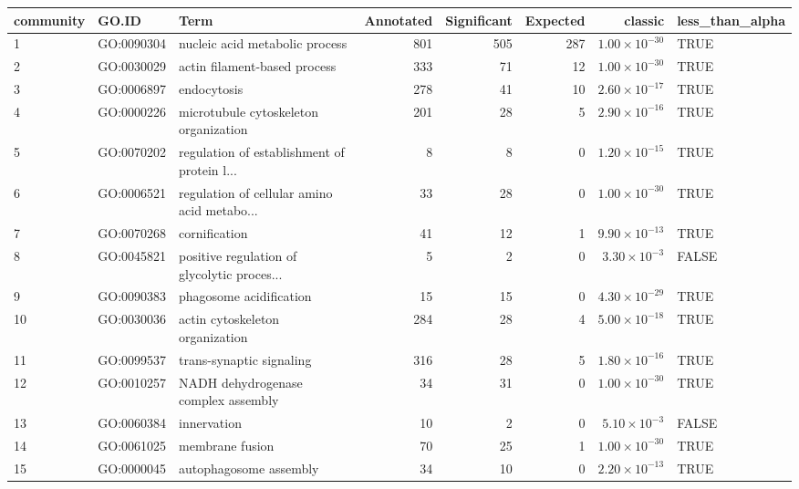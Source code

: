 \begin{table}[ht]
\centering
\begin{adjustbox}{max width=\textwidth}
\begin{tabular}{lllrrrrl}
  \hline
community & GO.ID & Term & Annotated & Significant & Expected & classic & less\_than\_alpha \\ 
  \hline
1 & GO:0090304 & nucleic acid metabolic process & 801 & 505 & 287 & $1.00 \times 10^{-30}$ & TRUE \\ 
  2 & GO:0030029 & actin filament-based process & 333 & 71 & 12 & $1.00 \times 10^{-30}$ & TRUE \\ 
  3 & GO:0006897 & endocytosis & 278 & 41 & 10 & $2.60 \times 10^{-17}$ & TRUE \\ 
  4 & GO:0000226 & microtubule cytoskeleton organization & 201 & 28 & 5 & $2.90 \times 10^{-16}$ & TRUE \\ 
  5 & GO:0070202 & regulation of establishment of protein l... & 8 & 8 & 0 & $1.20 \times 10^{-15}$ & TRUE \\ 
  6 & GO:0006521 & regulation of cellular amino acid metabo... & 33 & 28 & 0 & $1.00 \times 10^{-30}$ & TRUE \\ 
  7 & GO:0070268 & cornification & 41 & 12 & 1 & $9.90 \times 10^{-13}$ & TRUE \\ 
  8 & GO:0045821 & positive regulation of glycolytic proces... & 5 & 2 & 0 & $3.30 \times 10^{-3}$ & FALSE \\ 
  9 & GO:0090383 & phagosome acidification & 15 & 15 & 0 & $4.30 \times 10^{-29}$ & TRUE \\ 
  10 & GO:0030036 & actin cytoskeleton organization & 284 & 28 & 4 & $5.00 \times 10^{-18}$ & TRUE \\ 
  11 & GO:0099537 & trans-synaptic signaling & 316 & 28 & 5 & $1.80 \times 10^{-16}$ & TRUE \\ 
  12 & GO:0010257 & NADH dehydrogenase complex assembly & 34 & 31 & 0 & $1.00 \times 10^{-30}$ & TRUE \\ 
  13 & GO:0060384 & innervation & 10 & 2 & 0 & $5.10 \times 10^{-3}$ & FALSE \\ 
  14 & GO:0061025 & membrane fusion & 70 & 25 & 1 & $1.00 \times 10^{-30}$ & TRUE \\ 
  15 & GO:0000045 & autophagosome assembly & 34 & 10 & 0 & $2.20 \times 10^{-13}$ & TRUE \\ 

\end{tabular}
\end{adjustbox}
\end{table}
